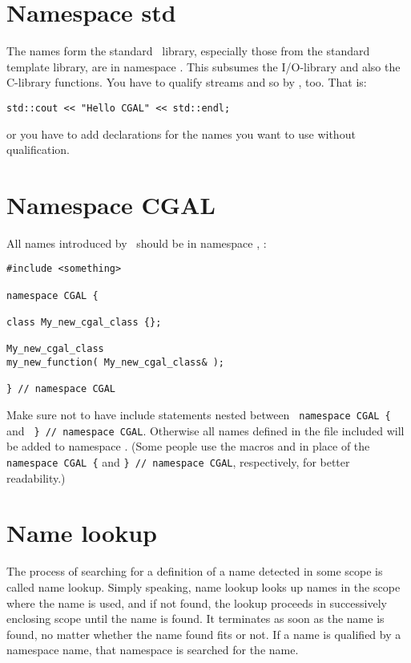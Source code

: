 \section{Namespace std}
The names form the standard \CC\ library, especially those from the standard
template library, are in namespace . This subsumes the I/O-library%
and also the C-library%
 functions. You have to qualify streams and so by
, too.  That is:
\begin{verbatim}
std::cout << "Hello CGAL" << std::endl;
\end{verbatim}
or you have to add  declarations for the names you want to
use without  qualification.

\section{Namespace CGAL}
All names introduced by \cgal\ should be in namespace , \eg: 
\begin{verbatim}
#include <something>

namespace CGAL {

class My_new_cgal_class {};

My_new_cgal_class 
my_new_function( My_new_cgal_class& );

} // namespace CGAL
\end{verbatim}
Make sure not to have include statements nested between 
\verb+ namespace CGAL { + and \verb+ } // namespace CGAL+.
Otherwise all names defined in the file included will be 
added to namespace .  (Some people use the macros
 and  
in place of the \texttt{namespace CGAL \{} and
\texttt{\} // namespace CGAL}, respectively, for better readability.)

\section{Name lookup}
The process of searching for a definition of a name detected in
some scope is called name lookup.
Simply speaking, name lookup looks 
up names in the scope where the name is used, 
and if not found, the lookup proceeds in successively enclosing scope 
until the name is found. It terminates as soon as the name is found, no
matter whether the name found fits or not.
If a name is qualified by a namespace name, that namespace is searched
for the name.

